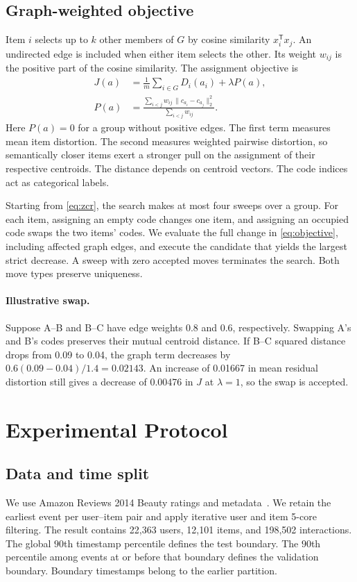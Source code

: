 \documentclass[10pt,twocolumn,letterpaper]{article}
\begin{document}
\subsection{Graph-weighted objective}
\label{sec:graph}
Item $i$ selects up to $k$ other members of $G$ by cosine similarity $x_i^{\mathsf T} x_j$.
An undirected edge is included when either item selects the other.
Its weight $w_{ij}$ is the positive part of the cosine similarity.
The assignment objective is
\begin{align}
    J(a) &= \frac{1}{m}\sum_{i\in G} D_i(a_i) + \lambda P(a), \label{eq:objective}\\
    P(a) &=
        \frac{\sum_{i<j} w_{ij}\,\|c_{a_i}-c_{a_j}\|_2^2}
             {\sum_{i<j} w_{ij}}. \label{eq:pair}
\end{align}
Here $P(a)=0$ for a group without positive edges.
The first term measures mean item distortion.
The second measures weighted pairwise distortion, so semantically closer items exert a stronger pull on the assignment of their respective centroids.
The distance depends on centroid vectors.
The code indices act as categorical labels.

Starting from \cref{eq:zcr}, the search makes at most four sweeps over a group.
For each item, assigning an empty code changes one item, and assigning an occupied code swaps the two items' codes.
We evaluate the full change in \cref{eq:objective}, including affected graph edges, and execute the candidate that yields the largest strict decrease.
A sweep with zero accepted moves terminates the search.
Both move types preserve uniqueness.

\paragraph{Illustrative swap.}
Suppose A--B and B--C have edge weights 0.8 and 0.6, respectively.
Swapping A's and B's codes preserves their mutual centroid distance.
If B--C squared distance drops from 0.09 to 0.04, the graph term decreases by $0.6(0.09-0.04)/1.4=0.02143$.
An increase of 0.01667 in mean residual distortion still gives a decrease of 0.00476 in $J$ at $\lambda=1$, so the swap is accepted.

\section{Experimental Protocol}
\label{sec:protocol}

\subsection{Data and time split}
We use Amazon Reviews 2014 Beauty ratings and metadata~\cite{mcauley2015image}.
We retain the earliest event per user--item pair and apply iterative user and item 5-core filtering.
The result contains 22,363 users, 12,101 items, and 198,502 interactions.
The global $90$th timestamp percentile defines the test boundary.
The $90$th percentile among events at or before that boundary defines the validation boundary.
Boundary timestamps belong to the earlier partition.
\end{document}
